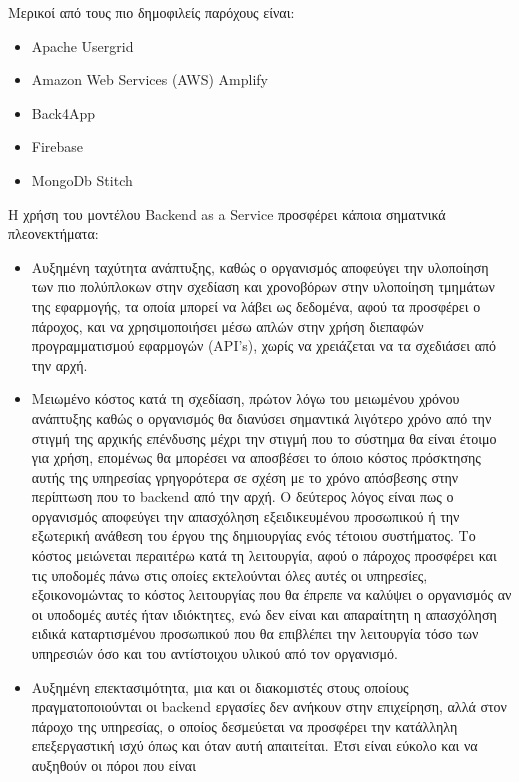 \documentclass{article}
\begin{document}
Μερικοί από τους πιο δημοφιλείς παρόχους είναι:
\begin{itemize}
\item Apache Usergrid
\item Amazon Web Services (AWS) Amplify
\item Back4App
\item Firebase
\item MongoDb Stitch
\end{itemize}
Η χρήση του μοντέλου Backend as a Service
προσφέρει κάποια σηματνικά πλεονεκτήματα:
\begin{itemize}
\item Αυξημένη ταχύτητα ανάπτυξης, καθώς ο οργανισμός αποφεύγει την
υλοποίηση των πιο πολύπλοκων στην σχεδίαση και χρονοβόρων στην υλοποίηση
τμημάτων της εφαρμογής, τα οποία μπορεί να λάβει ως δεδομένα, αφού τα
προσφέρει ο πάροχος, και να χρησιμοποιήσει μέσω απλών στην χρήση διεπαφών
προγραμματισμού εφαρμογών
(API’s), χωρίς να χρειάζεται
να τα σχεδιάσει από την αρχή.
\item Μειωμένο κόστος κατά τη σχεδίαση, πρώτον λόγω του μειωμένου χρόνου
ανάπτυξης καθώς ο οργανισμός θα διανύσει σημαντικά λιγότερο χρόνο από την
στιγμή της αρχικής επένδυσης μέχρι την στιγμή που το σύστημα θα είναι
έτοιμο για χρήση, επομένως θα μπορέσει να αποσβέσει το όποιο κόστος
πρόσκτησης αυτής της υπηρεσίας γρηγορότερα σε σχέση με το χρόνο απόσβεσης
στην περίπτωση που το
backend από την αρχή. Ο
δεύτερος λόγος είναι πως ο οργανισμός αποφεύγει την απασχόληση
εξειδικευμένου προσωπικού ή την εξωτερική ανάθεση του έργου της
δημιουργίας ενός τέτοιου συστήματος. Το κόστος μειώνεται περαιτέρω κατά τη
λειτουργία, αφού ο πάροχος προσφέρει και τις υποδομές πάνω στις οποίες
εκτελούνται όλες αυτές οι υπηρεσίες, εξοικονομώντας το κόστος λειτουργίας
που θα έπρεπε να καλύψει ο οργανισμός αν οι υποδομές αυτές ήταν
ιδιόκτητες, ενώ δεν είναι και απαραίτητη η απασχόληση ειδικά καταρτισμένου
προσωπικού που θα επιβλέπει την λειτουργία τόσο των υπηρεσιών όσο και του
αντίστοιχου υλικού από τον οργανισμό.
\item Αυξημένη επεκτασιμότητα, μια και οι διακομιστές στους οποίους
πραγματοποιούνται οι backend
εργασίες δεν ανήκουν στην επιχείρηση, αλλά στον πάροχο της υπηρεσίας, ο
οποίος δεσμεύεται να προσφέρει την κατάλληλη επεξεργαστική ισχύ όπως και
όταν αυτή απαιτείται. Έτσι είναι εύκολο και να αυξηθούν οι πόροι που είναι

\end{itemize}
\end{document}
